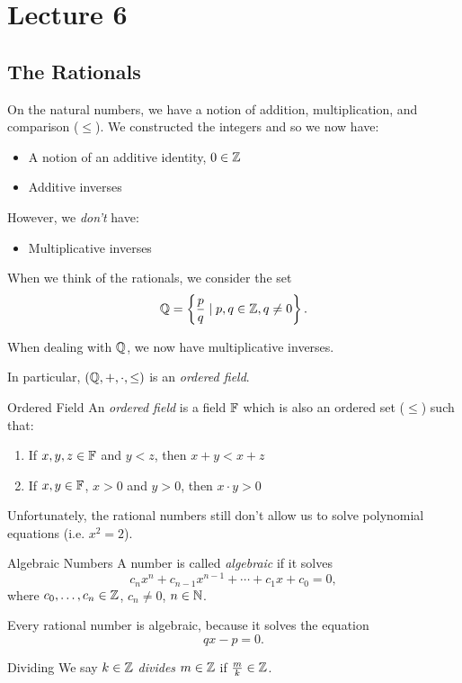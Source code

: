 \documentclass[class=article, crop=false]{standalone}
\begin{document}
  \section{Lecture 6}
  \subsection{The Rationals}
  On the natural numbers, we have a notion of addition, multiplication, and comparison ($\leq$). We constructed the integers and so we now have:
  \begin{itemize}
    \item A notion of an additive identity, $0\in\mathbb{Z}$
    \item Additive inverses
  \end{itemize}
  However, we \emph{don't} have:
  \begin{itemize}
    \item Multiplicative inverses
  \end{itemize}
  When we think of the rationals, we consider the set
  \[
    \mathbb{Q} = \left\{\frac{p}{q}\mid p, q\in\mathbb{Z}, q\neq 0\right\}.
  \]
  \begin{note}{}
    When dealing with $\mathbb{Q}$, we now have multiplicative inverses.
  \end{note}
  In particular, $(\mathbb{Q}, +, \cdot, \leq)$ is an \emph{ordered field}.
  \begin{definition}{Ordered Field}
    An \emph{ordered field} is a field $\mathbb{F}$ which is also an ordered set ($\leq$) such that:
    \begin{enumerate}[label=(\roman*)]
      \item If $x, y, z\in\mathbb{F}$ and $y < z$, then $x + y < x + z$
      \item If $x, y\in\mathbb{F}$, $x > 0$ and $y > 0$, then $x\cdot y > 0$
    \end{enumerate}
  \end{definition}
  Unfortunately, the rational numbers still don't allow us to solve polynomial equations (i.e. $x^2 = 2$).
  \begin{definition}{Algebraic Numbers}
    A number is called \emph{algebraic} if it solves
    \[
      c_nx^n + c_{n - 1}x^{n - 1} + \dotsb + c_1x + c_0 = 0,
    \]
    where $c_0,\dotsc,c_n\in\mathbb{Z}$, $c_n\neq 0$, $n\in\mathbb{N}$.
  \end{definition}
  \begin{example}{}
    Every rational number is algebraic, because it solves the equation
    \[
      qx - p = 0.
    \]
  \end{example}
  \begin{definition}{Dividing}
    We say $k\in\mathbb{Z}$ \emph{divides} $m\in\mathbb{Z}$ if $\frac{m}{k}\in\mathbb{Z}$.
  \end{definition}
\end{document}
